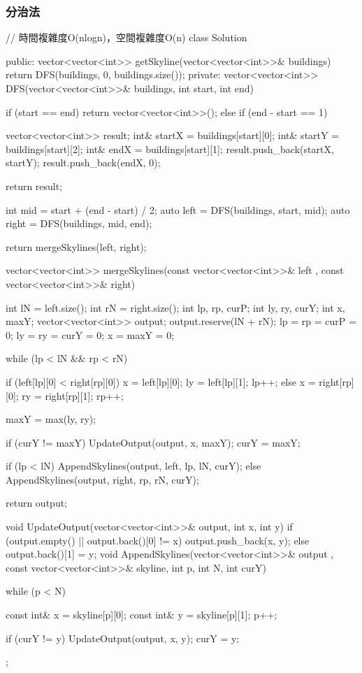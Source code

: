 \subsubsection{分治法}
\begin{Code}
// 時間複雜度O(nlogn)，空間複雜度O(n)
class Solution {
public:
    vector<vector<int>> getSkyline(vector<vector<int>>& buildings) {
        return DFS(buildings, 0, buildings.size());
    }
private:
    vector<vector<int>> DFS(vector<vector<int>>& buildings, int start, int end)
    {
        if (start == end)
        {
            return vector<vector<int>>();
        }
        else if (end - start == 1)
        {
            vector<vector<int>> result;
            int& startX = buildings[start][0];
            int& startY = buildings[start][2];
            int& endX = buildings[start][1];
            result.push_back({startX, startY});
            result.push_back({endX, 0});

            return result;
        }

        int mid = start + (end - start) / 2;
        auto left = DFS(buildings, start, mid);
        auto right = DFS(buildings, mid, end);

        return mergeSkylines(left, right);
    }
    vector<vector<int>> mergeSkylines(const vector<vector<int>>& left
                                      , const vector<vector<int>>& right)
    {
        int lN = left.size();
        int rN = right.size();
        int lp, rp, curP;
        int ly, ry, curY;
        int x, maxY;
        vector<vector<int>> output; output.reserve(lN + rN);
        lp = rp = curP = 0;
        ly = ry = curY = 0;
        x = maxY = 0;

        while (lp < lN && rp < rN)
        {
            if (left[lp][0] < right[rp][0])
            {
                x = left[lp][0];
                ly = left[lp][1];
                lp++;
            }
            else
            {
                x = right[rp][0];
                ry = right[rp][1];
                rp++;
            }

            maxY = max(ly, ry);

            if (curY != maxY)
            {
                UpdateOutput(output, x, maxY);
                curY = maxY;
            }
        }

        if (lp < lN)
            AppendSkylines(output, left, lp, lN, curY);
        else
            AppendSkylines(output, right, rp, rN, curY);


        return output;
    }
    void UpdateOutput(vector<vector<int>>& output, int x, int y)
    {
        if (output.empty() || output.back()[0] != x)
            output.push_back({x, y});
        else
            output.back()[1] = y;
    }
    void AppendSkylines(vector<vector<int>>& output
                        , const vector<vector<int>>& skyline, int p, int N, int curY)
    {
        while (p < N)
        {
            const int& x = skyline[p][0];
            const int& y = skyline[p][1];
            p++;

            if (curY != y)
            {
                UpdateOutput(output, x, y);
                curY = y;
            }
        }
    }
};
\end{Code}


